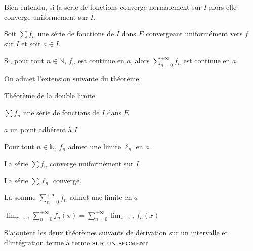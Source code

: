     Bien entendu, si la série de fonctions converge normalement sur $I$ alors elle converge uniformément sur $I$.

    \begin{theo}{}{}
        Soit $\sum  f_n$ une série de fonctions de $I$ dans $E$ convergeant uniformément vers $f$ sur $I$ et soit $a \in I$.

        Si, pour tout $n \in \mathbb{N}$, $f_n$ est continue en $a$, alors $\sum_{n=0}^{+\infty} f_n$ est continue en $a$.
    \end{theo}

    On admet l’extension suivante du théorème.

    \begin{theo}{Théorème de la double limite}{}
        \begin{soit}
            \item $\sum f_n$ une série de fonctions de $I$ dans $E$
            \item $a$ un point adhérent à $I$
        \end{soit}
        \begin{suppose}
            \item Pour tout $n \in \mathbb{N}$, $f_n$ admet une limite $\ell_n$ en $a$.
            \item La série $\sum f_n$ converge uniformément sur $I$.
        \end{suppose}
        \begin{alors}
            \item La série $\sum \ell_n$ converge.
            \item La somme $\sum_{n=0}^{+\infty} f_n$ admet une limite en $a$
            \item $\lim_{x \to a} \sum_{n=0}^{+\infty} f_n(x) = \sum_{n=0}^{+\infty} \lim_{x \to a} f_n(x)$
        \end{alors}
    \end{theo}

    S’ajoutent les deux théorèmes suivants de dérivation sur un intervalle et d’intégration terme à terme \textbf{\textsc{sur un segment}}.

